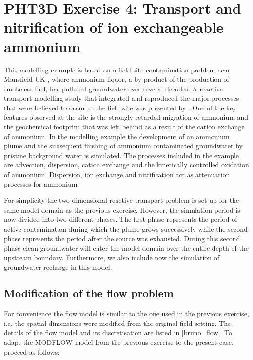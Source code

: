 \section[PHT3D Exercise 4: Transport and nitrification of ion exchangeable ammonium]{PHT3D Exercise 4: Transport and nitrification of ion exchangeable ammonium}

This modelling example is based on a field site contamination problem near
Mansfield UK \citep[see, e.g.,][]{broholm98, phddavison,jones1998, davison2000,
jones2001}, where ammonium liquor, a by-product of the production
of smokeless fuel, has polluted groundwater over several decades.
A reactive transport modelling study that integrated 
and reproduced the major processes that were believed to occur at the
field site was presented by \cite{haerens_phd}. 
One of the key features observed at the site is the
strongly retarded migration of ammonium and the geochemical footprint that
was left behind as a result of the cation exchange of ammonium.  
In the modelling example the development of an ammonium plume
and the subsequent flushing of ammonium contaminated groundwater by
pristine background water is simulated.  The processes included in
the example are advection, dispersion, cation exchange
and the kinetically controlled oxidation of ammonium.
Dispersion, ion exchange and nitrification act as attenuation 
processes for ammonium.

For simplicity the two-dimensional reactive transport problem is set up
for the same model domain as the previous exercise.
However, the simulation period is now divided into two different phases. 
The first phase represents the period 
of active contamination during which the plume grows successively
while the second phase represents the period after the source 
was exhausted. During this second phase clean groundwater will enter 
the model domain over the entire depth of the upstream boundary. 
Furthermore, we also include now the simulation of groundwater recharge
in this model.

\subsection[Modification of the flow problem]{Modification of the flow problem}

For convenience the flow model is similar to the one used in the previous exercise, i.e,
the spatial dimensions were modified from the original field setting.
The details of the flow model and its discretisation are listed in \ref{bruno_flow}.
To adapt the MODFLOW model from the previous exercise to the present case, 
proceed as follows:

